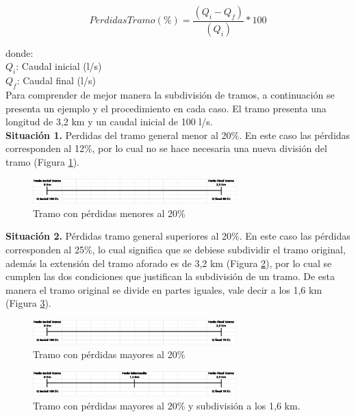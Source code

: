 \documentclass[]{article}
\begin{document}
\begin{equation}
Perdidas Tramo (\%)=\frac{(Q_i - Q_f)}{(Q_i)}*100
\end{equation}

donde:\\
$Q_i$: Caudal inicial (l/s)\\
$Q_f$: Caudal final (l/s)\\

Para comprender de mejor manera la subdivisión de tramos, a continuación se presenta un ejemplo y el procedimiento en cada caso. El tramo presenta una longitud de 3,2 km y un caudal inicial de 100 l/s.\\

\textbf{Situación 1.} Perdidas del tramo general menor al 20\%. En este caso las pérdidas corresponden al 12\%, por lo cual no se hace necesaria una nueva división del tramo (Figura \ref{sit_1}).

\begin{figure}[H]
\centering
\includegraphics[width=0.7\textwidth]{images/sit_1.eps}
\caption{Tramo con pérdidas menores al 20\%}
\label{sit_1}
\end{figure}

\textbf{Situación 2.} Pérdidas tramo general superiores al 20\%. En este caso las pérdidas corresponden al 25\%, lo cual significa que se debiese subdividir el tramo original, además la extensión del tramo aforado es de 3,2 km (Figura \ref{sit_2}), por lo cual se cumplen las dos condiciones que justifican la subdivisión de un tramo. De esta manera el tramo original se divide en partes iguales, vale decir a los 1,6 km (Figura \ref{sit_2_1}).

\begin{figure}[H]
\centering
\includegraphics[width=0.7\textwidth]{images/sit_2.eps}
\caption{Tramo con pérdidas mayores al 20\%}
\label{sit_2}
\end{figure}

\begin{figure}[H]
\centering
\includegraphics[width=0.7\textwidth]{images/sit_2_1.eps}
\caption{Tramo con pérdidas mayores al 20\% y subdivisión a los 1,6 km.}
\label{sit_2_1}
\end{figure}
\end{document}
